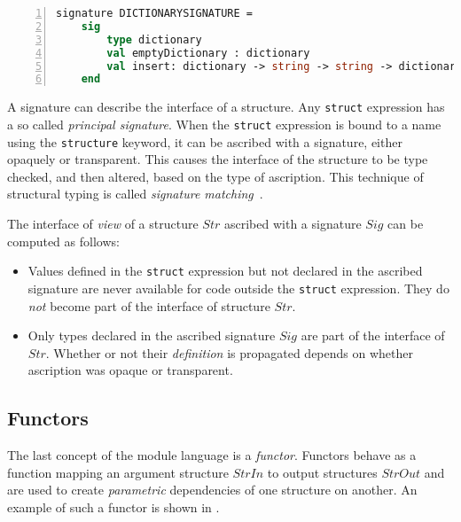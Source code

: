 \documentclass[11pt]{article}
\newcommand{\cmath}[1]{\ensuremath{\mathit{#1}}}
\begin{document}
\begin{lstlisting}[frame=single, language=ML, caption={[Dictionary Declaration Example]An example signature showing the declaration of a dictionary in ML.}, label=lst:DictionarySignatureExample, numbers=left]
signature DICTIONARYSIGNATURE =
    sig
        type dictionary
        val emptyDictionary : dictionary
        val insert: dictionary -> string -> string -> dictionary
    end
\end{lstlisting}

A signature can describe the interface of a structure.
Any \lstinline{struct} expression has a so called \emph{principal signature}.
When the \lstinline{struct} expression is bound to a name using the \lstinline{structure} keyword, it can be ascribed with a signature, either opaquely or transparent.
This causes the interface of the structure to be type checked, and then altered, based on the type of ascription.
This technique of structural typing is called \emph{signature matching}~\cite{Pierce:Adv}.

The interface of \emph{view} of a structure \cmath{Str} ascribed with a signature \cmath{Sig} can be computed as follows:
\begin{itemize}
\item Values defined in the \lstinline{struct} expression but not declared in the ascribed signature are never available for code outside the \lstinline{struct} expression.
They do \emph{not} become part of the interface of structure \cmath{Str}.
\item
Only types declared in the ascribed signature \cmath{Sig} are part of the interface of \cmath{Str}.
Whether or not their \emph{definition} is propagated depends on whether ascription was opaque or transparent.
\end{itemize}

\subsection{Functors}
The last concept of the module language is a \emph{functor}.
Functors behave as a function mapping an argument structure \cmath{StrIn} to output structures \cmath{StrOut} and are used to create \emph{parametric} dependencies of one structure on another.
An example of such a functor is shown in .
\end{document}

